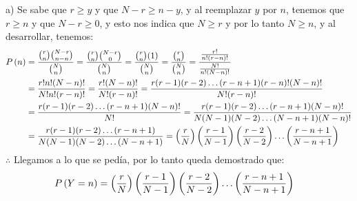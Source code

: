 a) Se sabe que $r \geq y$ y que $N-r \geq n-y$, y al reemplazar $y$ por $n$, tenemos que $r \geq n$ y que $N - r \geq 0$, y esto nos indica que $N \geq r$ y por lo tanto $N \geq n$, y al desarrollar, tenemos:
\begin{align*}
	{P} \left( {n} \right) & = \frac{\binom{r}{n} \binom{N-r}{n-n}}{\binom{N}{n}} 
	           = \frac{\binom{r}{n} \binom{N-r}{0}}{\binom{N}{n}} 
	           = \frac{\binom{r}{n} (1)}{\binom{N}{n}} 
	           = \frac{\binom{r}{n}}{\binom{N}{n}} 
	           = \frac{\frac{r!}{n! (r-n)!}}{\frac{N!}{n! (N-n)!}} \\
			 & = \frac{r! n! (N-n)!}{N! n! (r-n)!} 
			   = \frac{r! (N-n)!}{N! (r-n)!} 
			   = \frac{r (r-1) (r-2) \ldots (r-n+1) (r-n)! (N-n)!}{N! (r-n)!} \\
			 & = \frac{r (r-1) (r-2) \ldots (r-n+1) (N-n)!}{N!}
			   = \frac{r (r-1) (r-2) \ldots (r-n+1) (N-n)!}{N (N-1) (N-2) \ldots (N-n+1) (N-n)!} \\
			 & = \frac{r (r-1) (r-2) \ldots (r-n+1)}{N (N-1) (N-2) \ldots (N-n+1)}
			   = \left( \frac{r}{N} \right) \left( \frac{r-1}{N-1} \right) \left( \frac{r-2}{N-2} \right) \ldots \left( \frac{r-n+1}{N-n+1} \right)
\end{align*}
$\therefore$ Llegamos a lo que se pedía, por lo tanto queda demostrado que:
\begin{align*}
& {P} \left( {Y = n} \right) = \left( \frac{r}{N} \right) \left( \frac{r-1}{N-1} \right) \left( \frac{r-2}{N-2} \right) \ldots \left( \frac{r-n+1}{N-n+1} \right)
\end{align*}


